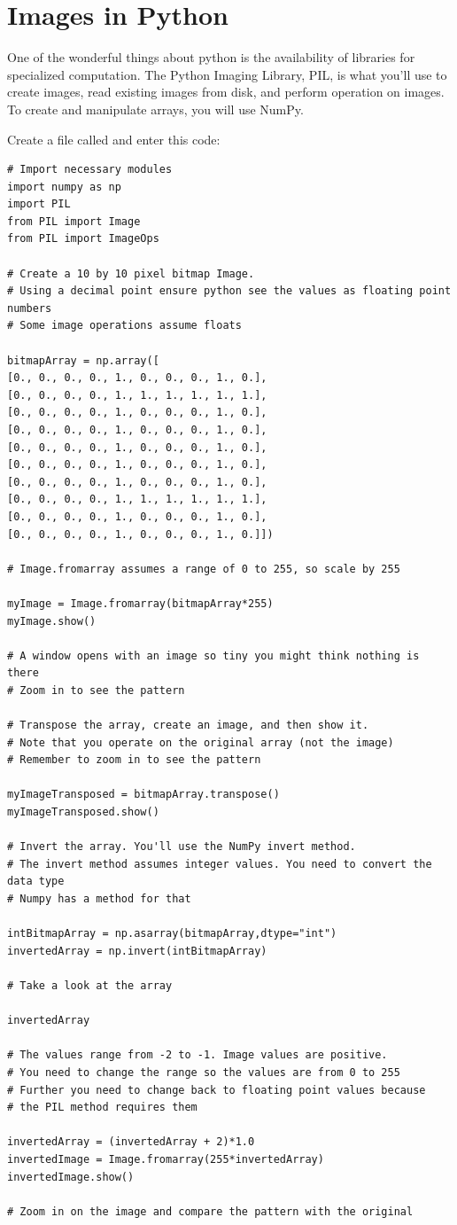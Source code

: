 \section{Images in Python}
One of the wonderful things about python is the availability of libraries for specialized computation. The Python Imaging Library, PIL, is what you'll use to create images, read existing images from disk, and perform operation on images. To create and manipulate arrays, you will use NumPy. 

Create a file called  and enter this code:

\begin{Verbatim}
# Import necessary modules
import numpy as np
import PIL
from PIL import Image
from PIL import ImageOps

# Create a 10 by 10 pixel bitmap Image. 
# Using a decimal point ensure python see the values as floating point numbers
# Some image operations assume floats

bitmapArray = np.array([
[0., 0., 0., 0., 1., 0., 0., 0., 1., 0.],
[0., 0., 0., 0., 1., 1., 1., 1., 1., 1.],
[0., 0., 0., 0., 1., 0., 0., 0., 1., 0.],
[0., 0., 0., 0., 1., 0., 0., 0., 1., 0.],
[0., 0., 0., 0., 1., 0., 0., 0., 1., 0.],
[0., 0., 0., 0., 1., 0., 0., 0., 1., 0.],
[0., 0., 0., 0., 1., 0., 0., 0., 1., 0.],
[0., 0., 0., 0., 1., 1., 1., 1., 1., 1.],
[0., 0., 0., 0., 1., 0., 0., 0., 1., 0.],
[0., 0., 0., 0., 1., 0., 0., 0., 1., 0.]])

# Image.fromarray assumes a range of 0 to 255, so scale by 255

myImage = Image.fromarray(bitmapArray*255)
myImage.show()

# A window opens with an image so tiny you might think nothing is there
# Zoom in to see the pattern  

# Transpose the array, create an image, and then show it. 
# Note that you operate on the original array (not the image)
# Remember to zoom in to see the pattern 

myImageTransposed = bitmapArray.transpose()
myImageTransposed.show()

# Invert the array. You'll use the NumPy invert method.
# The invert method assumes integer values. You need to convert the data type
# Numpy has a method for that

intBitmapArray = np.asarray(bitmapArray,dtype="int")
invertedArray = np.invert(intBitmapArray)

# Take a look at the array

invertedArray

# The values range from -2 to -1. Image values are positive.
# You need to change the range so the values are from 0 to 255
# Further you need to change back to floating point values because
# the PIL method requires them

invertedArray = (invertedArray + 2)*1.0
invertedImage = Image.fromarray(255*invertedArray)
invertedImage.show()

# Zoom in on the image and compare the pattern with the original

\end{Verbatim}

